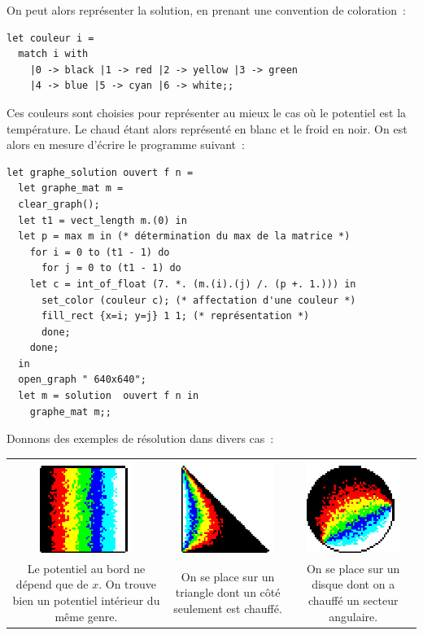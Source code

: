 On peut alors représenter la solution, en prenant une convention de coloration~:\par
\begin{verbatim}
let couleur i =
  match i with
    |0 -> black |1 -> red |2 -> yellow |3 -> green
    |4 -> blue |5 -> cyan |6 -> white;;
\end{verbatim}
Ces couleurs sont choisies pour représenter au mieux le cas o\`u le potentiel est la température. Le chaud étant alors représenté en blanc et le froid en noir.
On est alors en mesure d'écrire le programme suivant~:\par
\begin{verbatim}
let graphe_solution ouvert f n =
  let graphe_mat m =
  clear_graph();
  let t1 = vect_length m.(0) in
  let p = max m in (* détermination du max de la matrice *)
    for i = 0 to (t1 - 1) do
      for j = 0 to (t1 - 1) do
	let c = int_of_float (7. *. (m.(i).(j) /. (p +. 1.))) in
	  set_color (couleur c); (* affectation d'une couleur *)
	  fill_rect {x=i; y=j} 1 1; (* représentation *)
      done;
    done;
  in
  open_graph " 640x640";
  let m = solution  ouvert f n in
    graphe_mat m;;
\end{verbatim}\par
Donnons des exemples de résolution dans divers cas~:\par\vspace{2ex}
\begin{tabular}{ccc}
\includegraphics*[width=3cm,height=3cm]{images/drapeau.ps} & 
\includegraphics*[width=3.5cm,height=3cm]{images/triangle.ps} & 
\includegraphics*[width=3cm,height=3cm]{images/rond.ps}\\
\begin{minipage}{5cm}
Le potentiel au bord ne dépend que de $x$. On trouve bien un potentiel intérieur du même genre.
\end{minipage} & 
\begin{minipage}{5cm}
On se place sur un triangle dont un côté seulement est chauffé.
\end{minipage} &
\begin{minipage}{5cm}
On se place sur un disque dont on a chauffé un secteur angulaire.
\end{minipage}
\end{tabular}\par
